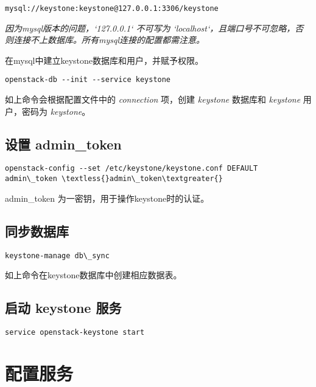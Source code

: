 \documentclass[a4paper,12pt,english]{sphinxmanual}
\begin{document}
\begin{Verbatim}[commandchars=\\\{\}]
mysql://keystone:keystone@127.0.0.1:3306/keystone
\end{Verbatim}

\emph{因为mysql版本的问题，{}`127.0.0.1{}` 不可写为 {}`localhost{}`，且端口号不可忽略，否则连接不上数据库。所有mysql连接的配置都需注意。}

在mysql中建立keystone数据库和用户，并赋予权限。

\begin{Verbatim}[commandchars=\\\{\}]
openstack-db --init --service keystone
\end{Verbatim}

如上命令会根据配置文件中的 \emph{connection} 项，创建 \emph{keystone} 数据库和 \emph{keystone} 用户，密码为 \emph{keystone}。


\subsection{设置 admin\_token}
\label{keystone:admin-token}
\begin{Verbatim}[commandchars=\\\{\}]
openstack-config --set /etc/keystone/keystone.conf DEFAULT admin\_token \textless{}admin\_token\textgreater{}
\end{Verbatim}

admin\_token 为一密钥，用于操作keystone时的认证。


\subsection{同步数据库}
\label{keystone:id3}
\begin{Verbatim}[commandchars=\\\{\}]
keystone-manage db\_sync
\end{Verbatim}

如上命令在keystone数据库中创建相应数据表。


\subsection{启动 keystone 服务}
\label{keystone:id4}
\begin{Verbatim}[commandchars=\\\{\}]
service openstack-keystone start
\end{Verbatim}


\section{配置服务}
\label{keystone:id5}
\end{document}
